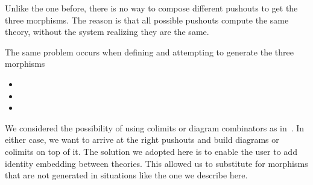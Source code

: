 Unlike the one before, there is no way to compose different pushouts to get the three morphisms. The reason is that all possible pushouts compute the same theory, without the system realizing they are the same. 

The same problem occurs when defining  and attempting to generate the three morphisms 
\begin{itemize}
    \item {}
    \item {}
    \item {}
\end{itemize}

We considered the possibility of using colimits or diagram combinators as in~\cite{cicm2019diagrams}. In either case, we want to arrive at the right pushouts and build diagrams or colimits on top of it. The solution we adopted here is to enable the user to add identity embedding between theories. This allowed us to substitute for morphisms that are not generated in situations like the one we describe here. 

